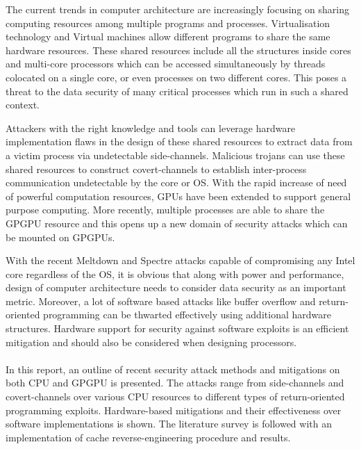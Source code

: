 \begin{Abstract}

    The current trends in computer architecture are increasingly 
    focusing on sharing computing resources among multiple programs
    and processes.
    Virtualisation technology and Virtual machines allow different 
    programs to share the same hardware resources.
These shared resources include all the structures inside cores and multi-core processors
which can be accessed simultaneously by threads colocated on a single core, or even processes
on two different cores. This poses a threat to the data security of many critical
processes which run in such a shared context.

Attackers with the right knowledge and tools
can leverage hardware implementation flaws in the design of these shared resources
to extract data from a victim process via undetectable side-channels. Malicious trojans
can use these shared resources to construct covert-channels to establish inter-process
communication undetectable by the core or OS. With the rapid increase of need of
powerful computation resources, GPUs have been extended to support general purpose computing.
More recently, multiple processes are able to share the GPGPU resource
and this opens up a new domain of security attacks which can be mounted on GPGPUs.

With the recent Meltdown  and Spectre  attacks capable of compromising any Intel core 
regardless of the OS, it is obvious that along with power and performance, design of
computer architecture needs to consider data security as an important metric.
Moreover, a lot of software based attacks like buffer overflow and return-oriented
programming can be thwarted effectively using additional hardware structures.
Hardware support for security against software exploits is an efficient mitigation
and should also be considered when designing processors.\\
\\

In this report, an outline of recent security attack methods and mitigations
on both CPU and GPGPU is presented. The attacks range from side-channels and covert-channels over
various CPU resources to different types of return-oriented programming exploits.
Hardware-based mitigations and their effectiveness over software implementations is shown.
The literature survey is followed with an implementation of cache reverse-engineering procedure
and results.
%
%
%
%
%
\end{Abstract}

